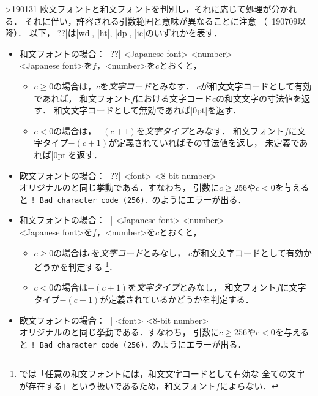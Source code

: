\documentclass[a4paper,11pt,nomag]{jsarticle}
\begin{document}
\begin{cslist}
\ifnum\epTeXversion>190131 %
  欧文フォントと和文フォントを判別し，それに応じて処理が分かれる．
  それに伴い，許容される引数範囲と意味が異なることに注意
  （\epTeX~190709以降）．
  以下，|??|は|wd|, |ht|, |dp|, |ic|のいずれかを表す．
  \begin{itemize}
    \item 和文フォントの場合： |\fontchar??| <Japanese font> <number>\\
      <Japanese font>を$f$，<number>を$c$とおくと，
      \begin{itemize}
        \item $c \geq 0$の場合は，$c$を\emph{文字コード}とみなす．
          $c$が和文文字コードとして有効であれば，
          和文フォント$f$における文字コード$c$の和文文字の寸法値を返す．
          和文文字コードとして無効であれば|0pt|を返す．
        \item $c < 0$の場合は，$-(c+1)$を\emph{文字タイプ}とみなす．
          和文フォント$f$に文字タイプ$-(c+1)$が定義されていればその寸法値を返し，
          未定義であれば|0pt|を返す．
      \end{itemize}
    \item 欧文フォントの場合： |\fontchar??| <font> <8-bit number>\\
      オリジナルの\eTeX と同じ挙動である．すなわち，
      引数に$c \geq 256$や$c < 0$を与えると
      \verb+! Bad character code (256).+
      のようにエラーが出る．
  \end{itemize}

 \csitem[\.{iffontchar}]
  \begin{itemize}
    \item 和文フォントの場合： |\iffontchar| <Japanese font> <number>\\
      <Japanese font>を$f$，<number>を$c$とおくと，
      \begin{itemize}
        \item $c \geq 0$の場合は$c$を\emph{文字コード}とみなし，
          $c$が和文文字コードとして有効かどうかを判定する
          \footnote{\pTeX では「任意の和文フォントには，和文文字コードとして有効な
          全ての文字が存在する」という扱いであるため，和文フォント$f$によらない．}．
        \item $c < 0$の場合は$-(c+1)$を\emph{文字タイプ}とみなし，
          和文フォント$f$に文字タイプ$-(c+1)$が定義されているかどうかを判定する．
      \end{itemize}
    \item 欧文フォントの場合： |\iffontchar| <font> <8-bit number>\\
      オリジナルの\eTeX と同じ挙動である．すなわち，
      引数に$c \geq 256$や$c < 0$を与えると
      \verb+! Bad character code (256).+
      のようにエラーが出る．
  \end{itemize}
\fi %
\end{cslist}
\end{document}
